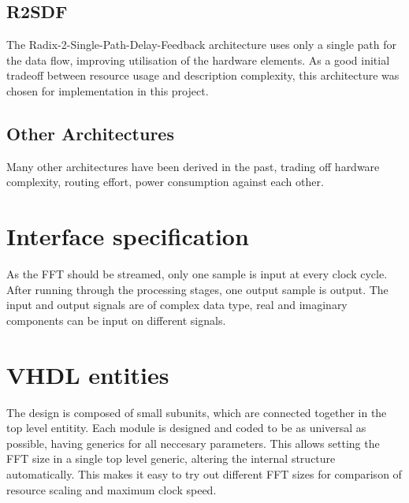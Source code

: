 \section{R2SDF}
The Radix-2-Single-Path-Delay-Feedback architecture uses only a single path for the data flow, improving utilisation of the hardware elements. As a good initial tradeoff between resource usage and description complexity, this architecture was chosen for implementation in this project.

\section{Other Architectures}
Many other architectures have been derived in the past, trading off hardware complexity, routing effort, power consumption against each other.

\chapter{Interface specification}
As the FFT should be streamed, only one sample is input at every clock cycle. After running through the processing stages, one output sample is output. The input and output signals are of complex data type, real and imaginary components can be input on different signals. 

\chapter{VHDL entities}
The design is composed of small subunits, which are connected together in the top level entitity. Each module is designed and coded to be as universal as possible, having generics for all neccesary parameters. This allows setting the FFT size in a single top level generic, altering the internal structure automatically.
This makes it easy to try out different FFT sizes for comparison of resource scaling and maximum clock speed.

